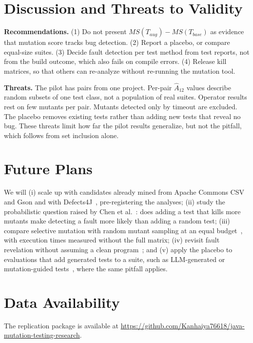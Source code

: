 \documentclass[conference]{IEEEtran}
\newif\ifanonymous
\newcommand{\MS}{\mathit{MS}}
\newcommand{\Tbase}{T_{\mathit{base}}}
\newcommand{\Taug}{T_{\mathit{aug}}}
\begin{document}
\section{Discussion and Threats to Validity}
\textbf{Recommendations.} (1) Do not present $\MS(\Taug) - \MS(\Tbase)$ as evidence that mutation score tracks
bug detection. (2) Report a placebo, or compare equal-size suites. (3) Decide fault detection per test method
from test reports, not from the build outcome, which also fails on compile errors. (4) Release kill matrices,
so that others can re-analyze without re-running the mutation tool.

\textbf{Threats.} The pilot has \PitfallPairs{} pairs from one project. Per-pair $\hat{A}_{12}$ values describe
random subsets of one test class, not a population of real suites. Operator results rest on few mutants per
pair. Mutants detected only by timeout are excluded. The placebo removes existing tests rather than adding new
tests that reveal no bug. These threats limit how far the pilot results generalize, but not the pitfall, which
follows from set inclusion alone.

\section{Future Plans}
We will (i) scale up with candidates already mined from Apache Commons CSV and Gson and with
Defects4J~\cite{just2014defects4j,laurent2022revisiting}, pre-registering the analyses; (ii) study the
probabilistic question raised by Chen et al.~\cite{chen2020revisiting}: does adding a test that kills more
mutants make detecting a fault more likely than adding a random test; (iii) compare selective mutation with
random mutant sampling at an equal budget~\cite{gopinath2016limits}, with execution times measured without the
full matrix; (iv) revisit fault revelation without assuming a clean program~\cite{chekam2017empirical}; and
(v) apply the placebo to evaluations that add generated tests to a suite, such as LLM-generated or
mutation-guided tests~\cite{foster2025mutation,zhao2026coverage}, where the same pitfall applies.

\section*{Data Availability}
\ifanonymous
The anonymized replication package (harness, raw PIT and Surefire reports with kill matrices, results, and the
scripts that generate this paper's numbers, tables and figures) is available at
\url{https://anonymous.4open.science/r/TODO}.
\else
The replication package is available at
\url{https://github.com/Kanhaiya76618/java-mutation-testing-research}.
\fi
\end{document}
